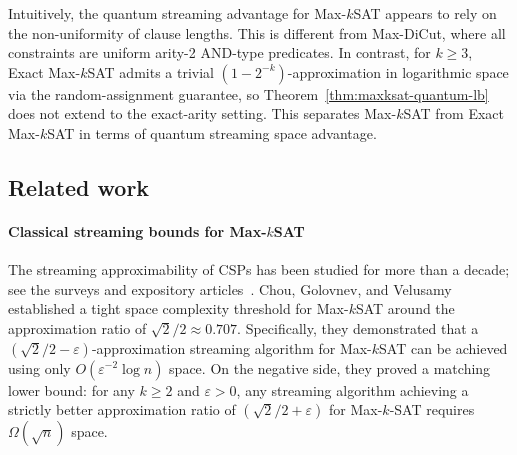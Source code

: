 Intuitively, the quantum streaming advantage for Max-$k$SAT appears to rely on the non-uniformity of clause lengths. This is different from Max-DiCut, where all constraints are uniform arity-2 AND-type predicates. In contrast, for $k\ge 3$, Exact Max-$k$SAT admits a trivial $(1-2^{-k})$-approximation in logarithmic space via the random-assignment guarantee, so Theorem~\ref{thm:maxksat-quantum-lb} does not extend to the exact-arity setting. This separates Max-$k$SAT from Exact Max-$k$SAT in terms of quantum streaming space advantage.

\subsection{Related work}
\label{sec:prior-work}

\paragraph{Classical streaming bounds for Max-$k$SAT} The streaming approximability of CSPs has been studied for more than a decade; see the surveys and expository articles~\cite{Sud22, Ass23, Sin25}. Chou, Golovnev, and Velusamy \cite{CGV20} established a tight space complexity threshold for Max-$k$SAT around the approximation ratio of $\sqrt{2}/2 \approx 0.707$. Specifically, they demonstrated that a $(\sqrt{2}/2 - \varepsilon)$-approximation  streaming algorithm for Max-$k$SAT can be achieved using only $O(\varepsilon^{-2} \log n)$ space. On the negative side, they proved a matching lower bound: for any $k \ge 2$ and $\varepsilon > 0$, any streaming algorithm achieving a strictly better approximation ratio of $(\sqrt{2}/2 + \varepsilon)$ for Max-$k$-SAT requires $\Omega(\sqrt{n})$ space.

